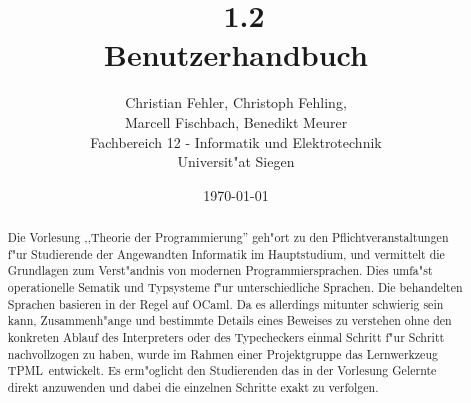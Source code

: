 \documentclass[a4paper,fleqn,latin1,twoside,12pt]{report}
\title{{\Huge \TPML\ 1.2}\\Benutzerhandbuch}
\author{{\Large Christian Fehler, Christoph Fehling,}\\{\Large Marcell Fischbach, Benedikt Meurer}\\Fachbereich 12 - Informatik und Elektrotechnik\\Universit"at Siegen}
\date{\small\today}
\newcommand{\TPML}{\textsf{\textmd{TPML}}}
\begin{document}
\maketitle

\begin{abstract}
Die Vorlesung ,,Theorie der Programmierung'' geh"ort zu den Pflichtveranstaltungen f"ur Studierende der Angewandten
Informatik im Hauptstudium, und vermittelt die Grundlagen zum Verst"andnis von modernen Programmiersprachen. Dies
umfa"st operationelle Sematik und Typsysteme f"ur unterschiedliche Sprachen. Die behandelten Sprachen basieren
in der Regel auf OCaml. Da es allerdings mitunter schwierig sein kann, Zusammenh"ange und bestimmte Details eines
Beweises zu verstehen ohne den konkreten Ablauf des Interpreters oder des Typecheckers einmal Schritt f"ur Schritt
nachvollzogen zu haben, wurde im Rahmen einer Projektgruppe das Lernwerkzeug \TPML\ entwickelt. Es erm"oglicht den
Studierenden das in der Vorlesung Gelernte direkt anzuwenden und dabei die einzelnen Schritte exakt zu verfolgen.
\end{abstract}

\tableofcontents
\newpage









\begin{appendix}

\end{appendix}

\printindex
\end{document}
